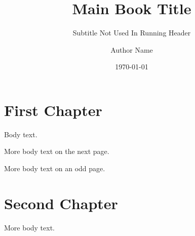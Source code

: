 \documentclass[12pt]{book}
\title{Main Book Title}
\subtitle{Subtitle Not Used In Running Header}
\author{Author Name}
\date{\today}
\begin{document}
\frontmatter
\maketitle

\tableofcontents

\mainmatter

\chapter{First Chapter}

Body text.

\newpage

More body text on the next page.

\newpage

More body text on an odd page.

\chapter{Second Chapter}

More body text.
\end{document}
